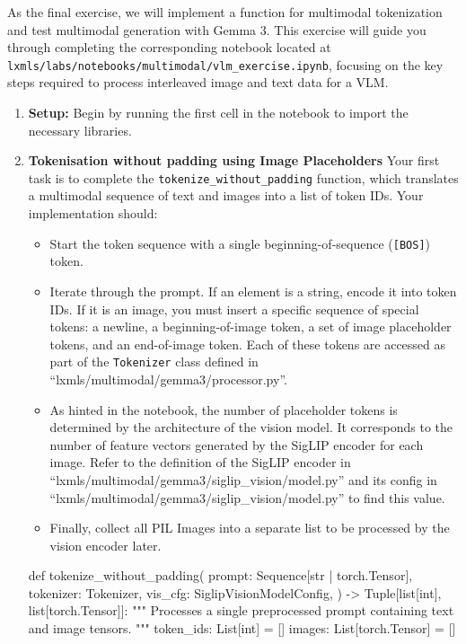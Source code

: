 \begin{exercise}
As the final exercise, we will implement a function for multimodal tokenization and test multimodal generation with Gemma 3. 
This exercise will guide you through completing the corresponding notebook located at \texttt{lxmls/labs/notebooks/multimodal/vlm\_exercise.ipynb}, focusing on the key steps required to process interleaved image and text data for a VLM.

\begin{enumerate}
    \item \textbf{Setup:}
    Begin by running the first cell in the notebook to import the necessary libraries.

    \item \textbf{Tokenisation without padding using Image Placeholders}\newline
    Your first task is to complete the \texttt{tokenize\_without\_padding} function, which translates a multimodal sequence of text and images into a list of token IDs. Your implementation should:
    \begin{itemize}
        \item Start the token sequence with a single beginning-of-sequence (\texttt{[BOS]}) token.
        \item Iterate through the prompt. If an element is a string, encode it into token IDs. If it is an image, you must insert a specific sequence of special tokens: a newline, a beginning-of-image token, a set of image placeholder tokens, and an end-of-image token. Each of these tokens are accessed as part of the \texttt{Tokenizer} class defined in ``lxmls/multimodal/gemma3/processor.py''.
        \item As hinted in the notebook, the number of placeholder tokens is determined by the architecture of the vision model. It corresponds to the number of feature vectors generated by the SigLIP encoder for each image. Refer to the definition of the SigLIP encoder in ``lxmls/multimodal/gemma3/siglip\_vision/model.py'' and its config in ``lxmls/multimodal/gemma3/siglip\_vision/model.py'' to find this value.
        \item Finally, collect all PIL Images into a separate list to be processed by the vision encoder later.
    \end{itemize}
    \begin{python}
def tokenize_without_padding(
    prompt: Sequence[str | torch.Tensor],
    tokenizer: Tokenizer,
    vis_cfg: SiglipVisionModelConfig,
) -> Tuple[list[int], list[torch.Tensor]]:
    """
    Processes a single preprocessed prompt containing text and image tensors.
    """
    token_ids: List[int] = []
    images: List[torch.Tensor] = []


\end{python}
\end{enumerate}
\end{exercise}
